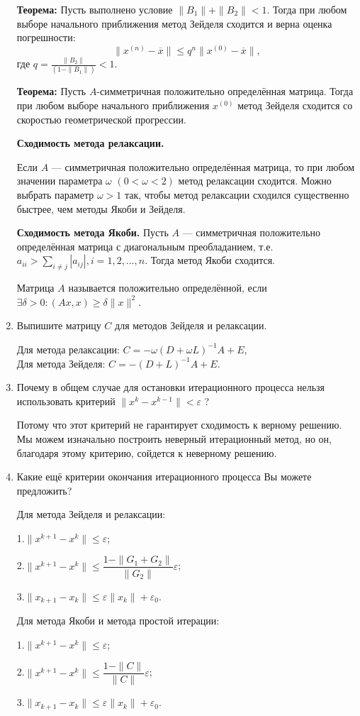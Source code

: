 \documentclass[12pt, a4paper]{article}
\begin{document}
\begin{enumerate}
\textbf{Теорема:}
Пусть выполнено условие $\|B_{1}\|+\|B_{2}\| < 1.$ Тогда при любом выборе начального приближения метод Зейделя сходится и верна оценка погрешности:
$$ \|x^{(n)}-\overline x\| \leq q^{n}\|x^{(0)}-\overline x\|,$$
где $q=\frac{\|B_{2}\|}{(1-\|B_{1}\|)}<1.$ 

\textbf{Теорема:}
Пусть $A$-симметричная положительно определённая матрица. Тогда при любом выборе начального приближения $x^{(0)}$ метод Зейделя сходится со скоростью геометрической прогрессии.

\textbf{Сходимость метода релаксации.}

Если $A$ --- симметричная положительно определённая матрица, то при любом значении параметра $\omega$ $(0<\omega<2)$ метод релаксации сходится. Можно выбрать параметр $\omega>1$ так, чтобы метод релаксации сходился существенно быстрее, чем методы Якоби и Зейделя. 
	
\textbf{Сходимость метода Якоби.}
Пусть $A$ --- симметричная положительно определённая матрица с диагональным преобладанием, т.е. $a_{ii} > \sum\limits_{i \neq j}|a_{ij}|, i=1,2,\ldots,n.$ Тогда метод Якоби сходится. 
		
Матрица $A$  называется положительно определённой, если $\exists \delta>0: (Ax,x) \geq \delta \|x\|^{2}.$ \\
	
		
\item  Выпишите матрицу $C$ для методов Зейделя и релаксации.

Для метода релаксации: $C=-\omega {(D+\omega L)}^{-1}A+E,$\\
Для метода Зейделя: $C=-(D+L)^{-1}A+E$. \\
 
\item  Почему в общем случае для остановки итерационного процесса нельзя использовать критерий $\|x^{k}-x^{k-1}\|<\varepsilon$ ?

Потому что этот критерий не гарантирует сходимость к верному решению. Мы можем изначально построить неверный итерационный метод, но он, благодаря этому критерию, сойдется к неверному решению. 
	
\item Какие ещё критерии окончания итерационного процесса Вы можете предложить?

Для метода Зейделя и релаксации:

1.$\|x^{k+1}-x^{k}\| \leq \varepsilon$; 

2.$\|x^{k+1}-x^{k}\| \leq \dfrac{1-\|G_{1}+G_{2}\|}{\|G_{2}\|} \varepsilon$; 

3.$\|x_{k+1}-x_{k}\| \leq \varepsilon\|x_{k}\| +\varepsilon_{0}$.
	
Для метода Якоби и метода простой итерации:

1.$\|x^{k+1}-x^{k}\| \leq \varepsilon$; 

2.$\|x^{k+1}-x^{k}\| \leq \dfrac{1-\|C\|}{\|C\|} \varepsilon$; 

3.$\|x_{k+1}-x_{k}\| \leq \varepsilon\|x_{k}\| +\varepsilon_{0}$.
		
		
\newpage
\end{enumerate}
\newpage
\end{document}
